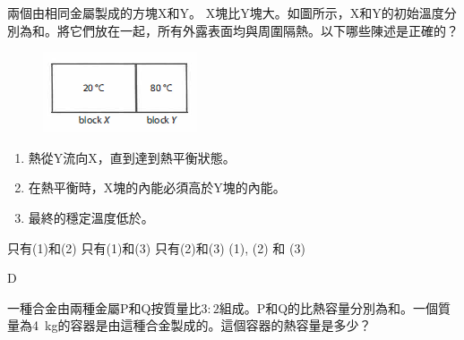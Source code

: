 {
    兩個由相同金屬製成的方塊X和Y。 X塊比Y塊大。如圖所示，X和Y的初始溫度分別為和。將它們放在一起，所有外露表面均與周圍隔熱。以下哪些陳述是正確的？
    \begin{figure}[h]
        \centering
        \includegraphics[width=0.35\linewidth]{assets/Screenshot 2023-08-29 143228.png}
    \end{figure}
    \begin{enumerate}[label=\sd]
        \item 熱從Y流向X，直到達到熱平衡狀態。
        \item 在熱平衡時，X塊的內能必須高於Y塊的內能。
        \item 最終的穩定溫度低於。
    \end{enumerate}
    \begin{choices}
        \choice 只有(1)和(2)
        \choice 只有(1)和(3)
        \choice 只有(2)和(3)
        \CorrectChoice (1), (2) 和 (3)
    \end{choices}
}{\mckey D}

{
    一種合金由兩種金屬P和Q按質量比$3:2$組成。P和Q的比熱容量分別為和。一個質量為\qty{4}{kg}的容器是由這種合金製成的。這個容器的熱容量是多少？
    \begin{choices}
        \choice {}
        \choice {}
        \choice {}
        \CorrectChoice {}
    \end{choices}
}{\mckey }

